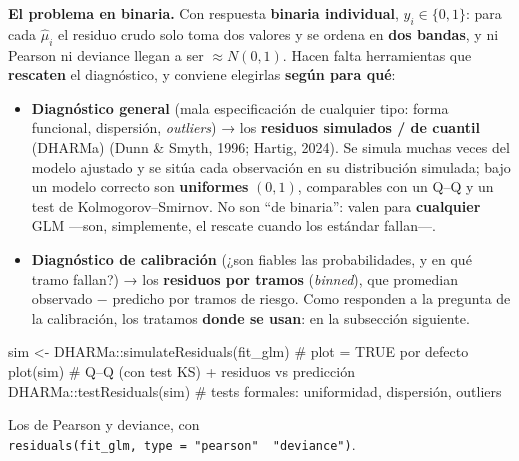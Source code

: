 \documentclass[
  letterpaper,
  DIV=11,
  numbers=noendperiod]{scrartcl}
\newenvironment{Shaded}{\begin{snugshade}}{\end{snugshade}}
\newcommand{\CommentTok}[1]{\textcolor[rgb]{0.37,0.37,0.37}{#1}}
\newcommand{\FunctionTok}[1]{\textcolor[rgb]{0.28,0.35,0.67}{#1}}
\newcommand{\NormalTok}[1]{\textcolor[rgb]{0.00,0.23,0.31}{#1}}
\newcommand{\OtherTok}[1]{\textcolor[rgb]{0.00,0.23,0.31}{#1}}
\newcommand{\SpecialCharTok}[1]{\textcolor[rgb]{0.37,0.37,0.37}{#1}}
\providecommand{\tightlist}{%
  \setlength{\itemsep}{0pt}\setlength{\parskip}{0pt}}\usepackage{longtable,booktabs,array}
\begin{document}
\textbf{El problema en binaria.} Con respuesta \textbf{binaria
individual}, \(y_i\in\{0,1\}\): para cada \(\hat\mu_i\) el residuo crudo
solo toma dos valores y se ordena en \textbf{dos bandas}, y ni Pearson
ni deviance llegan a ser \(\approx N(0,1)\). Hacen falta herramientas
que \textbf{rescaten} el diagnóstico, y conviene elegirlas \textbf{según
para qué}:

\begin{itemize}
\tightlist
\item
  \textbf{Diagnóstico general} (mala especificación de cualquier tipo:
  forma funcional, dispersión, \emph{outliers}) → los \textbf{residuos
  simulados / de cuantil} (DHARMa) (Dunn \& Smyth, 1996; Hartig, 2024).
  Se simula muchas veces del modelo ajustado y se sitúa cada observación
  en su distribución simulada; bajo un modelo correcto son
  \textbf{uniformes} \((0,1)\), comparables con un Q--Q y un test de
  Kolmogorov--Smirnov. No son ``de binaria'': valen para
  \textbf{cualquier} GLM ---son, simplemente, el rescate cuando los
  estándar fallan---.
\item
  \textbf{Diagnóstico de calibración} (¿son fiables las probabilidades,
  y en qué tramo fallan?) → los \textbf{residuos por tramos}
  (\emph{binned}), que promedian observado − predicho por tramos de
  riesgo. Como responden a la pregunta de la calibración, los tratamos
  \textbf{donde se usan}: en la subsección siguiente.
\end{itemize}

\begin{tcolorbox}[enhanced jigsaw, coltitle=black, rightrule=.15mm, arc=.35mm, leftrule=.75mm, colback=white, colbacktitle=quarto-callout-tip-color!10!white, left=2mm, breakable, toptitle=1mm, toprule=.15mm, bottomtitle=1mm, titlerule=0mm, title=\textcolor{quarto-callout-tip-color}{\faLightbulb}\hspace{0.5em}{🔧 En R. Residuos simulados (DHARMa)}, bottomrule=.15mm, opacityback=0, opacitybacktitle=0.6, colframe=quarto-callout-tip-color-frame]

\begin{Shaded}
\begin{Highlighting}[]
\NormalTok{sim }\OtherTok{\textless{}{-}}\NormalTok{ DHARMa}\SpecialCharTok{::}\FunctionTok{simulateResiduals}\NormalTok{(fit\_glm)   }\CommentTok{\# plot = TRUE por defecto}
\FunctionTok{plot}\NormalTok{(sim)                                   }\CommentTok{\# Q–Q (con test KS) + residuos vs predicción}
\NormalTok{DHARMa}\SpecialCharTok{::}\FunctionTok{testResiduals}\NormalTok{(sim)                  }\CommentTok{\# tests formales: uniformidad, dispersión, outliers}
\end{Highlighting}
\end{Shaded}

Los de Pearson y deviance, con
\texttt{residuals(fit\_glm,\ type\ =\ "pearson"\ \textbar{}\ "deviance")}.

\end{tcolorbox}
\end{document}
